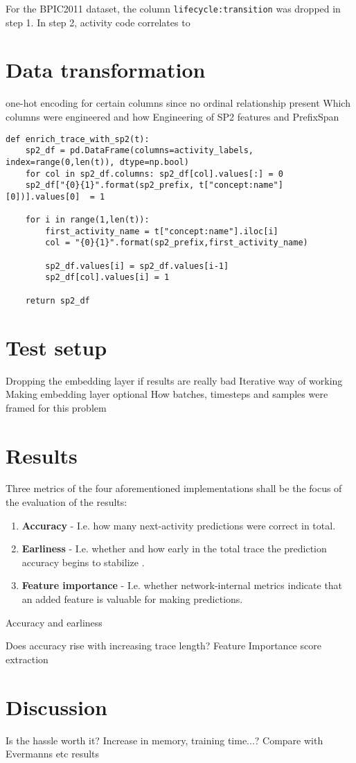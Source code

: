 For the BPIC2011 dataset, the column \texttt{lifecycle:transition} was dropped in step 1. In step 2, 
activity code correlates to 

\section{Data transformation}
one-hot encoding for certain columns since no ordinal relationship present
Which columns were engineered and how
Engineering of SP2 features and PrefixSpan \cite{web:prefixspan-py}

\begin{lstlisting}
def enrich_trace_with_sp2(t):
    sp2_df = pd.DataFrame(columns=activity_labels, index=range(0,len(t)), dtype=np.bool)
    for col in sp2_df.columns: sp2_df[col].values[:] = 0
    sp2_df["{0}{1}".format(sp2_prefix, t["concept:name"][0])].values[0]  = 1
    
    for i in range(1,len(t)):
        first_activity_name = t["concept:name"].iloc[i]
        col = "{0}{1}".format(sp2_prefix,first_activity_name)
        
        sp2_df.values[i] = sp2_df.values[i-1]
        sp2_df[col].values[i] = 1
        
    return sp2_df
\end{lstlisting}

\section{Test setup}
Dropping the embedding layer if results are really bad
Iterative way of working
Making embedding layer optional
How batches, timesteps and samples were framed for this problem

\section{Results}
Three metrics of the four aforementioned implementations shall be the focus of the evaluation of the results:
\begin{enumerate}
    \item\textbf{Accuracy} - I.e. how many next-activity predictions were correct in total.
    \item\textbf{Earliness} - I.e. whether and how early in the total trace the prediction accuracy begins to stabilize \cite{francescomarino2015}.
    \item\textbf{Feature importance} - I.e. whether network-internal metrics indicate that an added feature is valuable for making predictions.
\end{enumerate}

Accuracy and earliness

Does accuracy rise with increasing trace length?
Feature Importance score extraction

\section{Discussion}
Is the hassle worth it?
Increase in memory, training time...?
Compare with Evermanns etc results